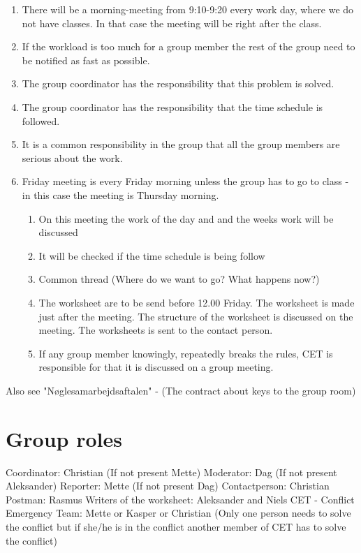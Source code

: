 \begin{enumerate}
\item There will be a morning-meeting from 9:10-9:20 every work day, where we do not have classes. In that case the meeting will be right after the class.
\item If the workload is too much for a group member the rest of the group need to be notified as fast as possible.
\item The group coordinator has the responsibility that this problem is solved. 
\item The group coordinator has the responsibility that the time schedule is followed.
\item It is a common responsibility in the group that all the group members are serious about the work.
\item Friday meeting is every Friday morning unless the group has to go to class - in this case the meeting is Thursday morning. 		\begin{enumerate}
	\item On this meeting the work of the day and and the weeks work will be discussed 
\item It will be checked if the time schedule is being follow 
\item Common thread (Where do we want to go? What happens now?) 
\item The worksheet are to be send before 12.00 Friday. The worksheet is made just after the meeting. The structure of the worksheet is discussed on the meeting. The worksheets is sent to the contact person.
\item If any group member knowingly, repeatedly breaks the rules, CET is responsible for that it is discussed on a group meeting.  
\end{enumerate}
\end{enumerate}

Also see "Nøglesamarbejdsaftalen" - (The contract about keys to the group room)

\section*{Group roles}

Coordinator: Christian (If not present Mette)
\newline
\newline
Moderator: Dag (If not present Aleksander)
\newline
\newline
Reporter: Mette (If not present Dag)
\newline
\newline
Contactperson: Christian
\newline
\newline
Postman: Rasmus
\newline
\newline
Writers of the worksheet: Aleksander and Niels
\newline
\newline
CET - Conflict Emergency Team: Mette or Kasper or Christian (Only one person needs to solve the conflict but if she/he is in the conflict another member of CET has to solve the conflict)